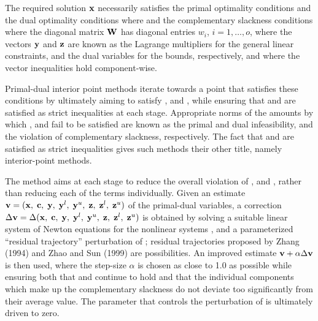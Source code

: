 \documentclass{galahad}
\begin{document}

\galmethod
The required solution ${\mathbf{x}}$ necessarily satisfies
the primal optimality conditions
and
the dual optimality conditions
where
and the complementary slackness conditions
where the diagonal matrix ${\mathbf{W}}$ has diagonal entries $w_i$,
$i = 1, \ldots , o$, where the vectors ${\mathbf{y}}$ and ${\mathbf{z}}$ are
known as the Lagrange multipliers for
the general linear constraints, and the dual variables for the bounds,
respectively, and where the vector inequalities hold component-wise.

Primal-dual interior point methods iterate towards a point
that satisfies these conditions by ultimately aiming to satisfy
,  and , while ensuring that
 and  are
satisfied as strict inequalities at each stage.
Appropriate norms of the amounts by
which ,  and  fail to be satisfied are known as the
primal and dual infeasibility, and the violation of complementary slackness,
respectively. The fact that  and  are satisfied as strict
inequalities gives such methods their other title, namely
interior-point methods.

The method aims at each stage to reduce the
overall violation of ,  and ,
rather than reducing each of the terms individually. Given an estimate
${\mathbf{v}} = ({\mathbf{x}}, \; {\mathbf{c}}, \; {\mathbf{y}}, \; {\mathbf{y}}^{l}, \;
{\mathbf{y}}^{u}, \; {\mathbf{z}}, \; {\mathbf{z}}^{l}, \; {\mathbf{z}}^{u})$
of the primal-dual variables, a correction
$\Delta {\mathbf{v}} = \Delta ({\mathbf{x}}, \; {\mathbf{c}}, \; {\mathbf{y}}, \; {\mathbf{y}}^{l},
 \; {\mathbf{y}}^{u} ,\;{\mathbf{z}},\;{\mathbf{z}}^{l} ,\;{\mathbf{z}}^{u} )$
is obtained by solving a suitable linear system of Newton equations for the
nonlinear systems ,  and a parameterized ``residual
trajectory'' perturbation of ; residual trajectories
proposed by Zhang (1994) and Zhao and Sun (1999) are possibilities.
An improved estimate ${\mathbf{v}} + \alpha \Delta {\mathbf{v}}$
is then used, where the step-size $\alpha$
is chosen as close to 1.0 as possible while ensuring both that
 and  continue to hold and that the individual components
which make up the complementary slackness
 do not deviate too significantly
from their average value. The parameter that controls the perturbation
of  is ultimately driven to zero.
\end{document}
